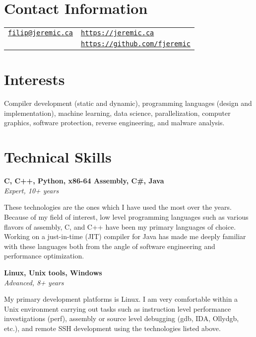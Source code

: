 \documentclass[margin,line]{res}
\begin{document}

\begin{resume}
\section{\sc Contact Information}

\vspace{.05in}

\begin{tabular}{@{}p{3.36in}p{3in}}
\href{mailto:filip@jeremic.ca}{\texttt{filip@jeremic.ca}} & \href{https://jeremic.ca}{\texttt{https://jeremic.ca}} \\
& \href{https://github.com/fjeremic}{\texttt{https://github.com/fjeremic}}
\end{tabular}

\section{\sc Interests}

Compiler development (static and dynamic), programming languages (design and implementation), machine learning, data
science, parallelization, computer graphics, software protection, reverse engineering, and malware analysis.

\section{\sc Technical \newline Skills}

{\bf C, C++, Python, x86-64 Assembly, C\#, Java} \\
{\em Expert, 10+ years}

These technologies are the ones which I have used the most over the years. Because of my field of interest, low level
programming languages such as various flavors of assembly, C, and C++ have been my primary languages of choice. Working 
on a just-in-time (JIT) compiler for Java has made me deeply familiar with these languages both from the angle of 
software engineering and performance optimization.

{\bf Linux, Unix tools, Windows } \\
{\em Advanced, 8+ years}

My primary development platforms is Linux. I am very comfortable within a Unix environment carrying out tasks such as
instruction level performance investigations (perf), assembly or source level debugging (gdb, IDA, Ollydgb, etc.), and
remote SSH development using the technologies listed above.


\end{resume}
\end{document}

